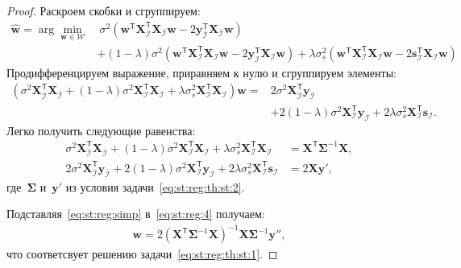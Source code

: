 \documentclass[12pt, twoside]{article}
\begin{document}
\begin{proof}
Раскроем скобки и сгруппируем:
\[
\label{eq:st:reg:3}
\begin{aligned}
\hat{\mathbf{w}} = \arg\min_{\mathbf{w}\in \mathcal{W}} &~ \sigma^2\left(\mathbf{w}^{\mathsf{T}}\mathbf{X}^{\mathsf{T}}_{\bar{\mathcal{I}}}\mathbf{X}_{\bar{\mathcal{I}}}\mathbf{w} - 2\mathbf{y}^{\mathsf{T}}_{\bar{\mathcal{I}}}\mathbf{X}_{\bar{\mathcal{I}}}\mathbf{w}\right) \\
&+ \left(1-\lambda\right)\sigma^2\left(\mathbf{w}^{\mathsf{T}}\mathbf{X}^{\mathsf{T}}_{\mathcal{I}}\mathbf{X}_{\mathcal{I}}\mathbf{w}- 2\mathbf{y}^{\mathsf{T}}_{\mathcal{I}}\mathbf{X}_{\mathcal{I}}\mathbf{w}\right) + \lambda\sigma^2_s\left(\mathbf{w}^{\mathsf{T}}\mathbf{X}^{\mathsf{T}}_{\mathcal{I}}\mathbf{X}_{\mathcal{I}}\mathbf{w}- 2\mathbf{s}^{\mathsf{T}}_{\mathcal{I}}\mathbf{X}_{\mathcal{I}}\mathbf{w}\right)
\end{aligned}
\]
Продифференцируем выражение, приравняем к нулю и сгруппируем элементы:
\[
\label{eq:st:reg:4}
\begin{aligned}
\left(\sigma^{2}\mathbf{X}^{\mathsf{T}}_{\bar{\mathcal{I}}}\mathbf{X}_{\bar{\mathcal{I}}} + \left(1-\lambda\right)\sigma^2\mathbf{X}^{\mathsf{T}}_{\mathcal{I}}\mathbf{X}_{\mathcal{I}} + \lambda\sigma^{2}_s\mathbf{X}^{\mathsf{T}}_{\mathcal{I}}\mathbf{X}_{\mathcal{I}}\right) \mathbf{w} =& 2\sigma^2\mathbf{X}^{\mathsf{T}}_{\bar{\mathcal{I}}}\mathbf{y}_{\bar{\mathcal{I}}} \\
&+ 2\left(1-\lambda\right)\sigma^2\mathbf{X}^{\mathsf{T}}_{\mathcal{I}}\mathbf{y}_{\mathcal{I}} + 2\lambda\sigma_s^2\mathbf{X}^{\mathsf{T}}_{\mathcal{I}}\mathbf{s}_{\mathcal{I}}.
\end{aligned}
\]
Легко получить следующие равенства:
\[
\label{eq:st:reg:simp}
\begin{aligned}
\sigma^{2}\mathbf{X}^{\mathsf{T}}_{\bar{\mathcal{I}}}\mathbf{X}_{\bar{\mathcal{I}}} + \left(1-\lambda\right)\sigma^2\mathbf{X}^{\mathsf{T}}_{\mathcal{I}}\mathbf{X}_{\mathcal{I}} + \lambda\sigma^{2}_s\mathbf{X}^{\mathsf{T}}_{\mathcal{I}}\mathbf{X}_{\mathcal{I}} &= \mathbf{X}^{\mathsf{T}}\bm{\Sigma}^{-1}\mathbf{X},\\
2\sigma^2\mathbf{X}^{\mathsf{T}}_{\bar{\mathcal{I}}}\mathbf{y}_{\bar{\mathcal{I}}} + 2\left(1-\lambda\right)\sigma^2\mathbf{X}^{\mathsf{T}}_{\mathcal{I}}\mathbf{y}_{\mathcal{I}} + 2\lambda\sigma_s^2\mathbf{X}^{\mathsf{T}}_{\mathcal{I}}\mathbf{s}_{\mathcal{I}} &= 2\mathbf{X}\mathbf{y'},
\end{aligned}
\]
где~$\bm{\Sigma}$ и~$\mathbf{y'}$ из условия задачи~\eqref{eq:st:reg:th:st:2}.

Подставляя~\eqref{eq:st:reg:simp} в~\eqref{eq:st:reg:4} получаем:
\[
\label{eq:st:reg:5}
\begin{aligned}
\mathbf{w} = 2\left(\mathbf{X}^{\mathsf{T}}\bm{\Sigma}^{-1}\mathbf{X}\right)^{-1}\mathbf{X}\bm{\Sigma}^{-1}\mathbf{y''},
\end{aligned}
\]
что соответсвует решению задачи~\eqref{eq:st:reg:th:st:1}.
\end{proof}
\end{document}
